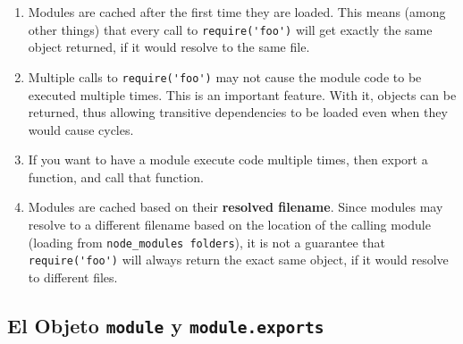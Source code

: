 \begin{enumerate}
\item
Modules are cached after the first time they are loaded. This means
(among other things) that every call to \verb|require('foo')| will get exactly
the same object returned, if it would resolve to the same file.

\item
Multiple calls to \verb|require('foo')| may not cause the module code
to be executed multiple times. This is an important feature. With it,
 objects can be returned, thus allowing transitive
dependencies to be loaded even when they would cause cycles.

\item
If you want to have a module execute code multiple times, then export
a function, and call that function.

\item
Modules are cached based on their {\bf resolved filename}. Since modules may
resolve to a different filename based on the location of the calling
module (loading from \verb|node_modules folders|), it is not a guarantee that
\verb|require('foo')| will always return the exact same object, if it would
resolve to different files.

\end{enumerate}

\subsection{El Objeto {\tt module} y {\tt module.exports}}

